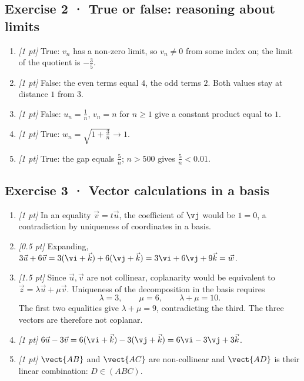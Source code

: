 \subsection*{Exercise 2 · True or false: reasoning about limits}\begin{enumerate}

\item \textit{[1 pt]} True: $v_n$ has a non-zero limit, so $v_n\ne0$ from some index on; the limit of the quotient is $-\frac{3}{5}$.

\item \textit{[1 pt]} False: the even terms equal $4$, the odd terms $2$. Both values stay at distance $1$ from $3$.

\item \textit{[1 pt]} False: $u_n=\frac{1}{n}$, $v_n=n$ for $n\ge1$ give a constant product equal to $1$.

\item \textit{[1 pt]} True: $w_n=\sqrt{1+\frac{3}{n}}\to1$.

\item \textit{[1 pt]} True: the gap equals $\frac{5}{n}$; $n>500$ gives $\frac{5}{n}<\num{0,01}$.

\end{enumerate}

\subsection*{Exercise 3 · Vector calculations in a basis}\begin{enumerate}

\item \textit{[1 pt]} In an equality $\vec v=t\vec u$, the coefficient of $\vj $ would be $1=0$, a contradiction by uniqueness of coordinates in a basis.

\item \textit{[0.5 pt]} Expanding, $3\vec u+6\vec v=3(\vi +\vec k)+6(\vj +\vec k)=3\vi +6\vj +9\vec k=\vec w$.

\item \textit{[1.5 pt]} Since $\vec u,\vec v$ are not collinear, coplanarity would be equivalent to $\vec z=\lambda\vec u+\mu\vec v$. Uniqueness of the decomposition in the basis requires
\[\lambda=3,\qquad\mu=6,\qquad\lambda+\mu=10.\]
The first two equalities give $\lambda+\mu=9$, contradicting the third. The three vectors are therefore not coplanar.

\item \textit{[1 pt]} $6\vec u-3\vec v=6(\vi +\vec k)-3(\vj +\vec k)=6\vi -3\vj +3\vec k$.

\item \textit{[1 pt]} $\vect{AB}$ and $\vect{AC}$ are non-collinear and $\vect{AD}$ is their linear combination: $D\in(ABC)$.

\end{enumerate}

